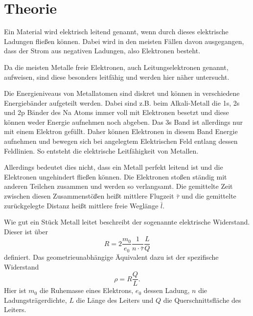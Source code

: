 \section{Theorie}
\label{sec:Theorie}






Ein Material wird elektrisch leitend genannt, wenn durch dieses elektrische Ladungen fließen können.
Dabei wird in den meisten Fällen davon ausgegangen, dass der Strom aus negativen Ladungen, also Elektronen besteht.

Da die meisten Metalle freie Elektronen, auch Leitungselektronen genannt, aufweisen, sind diese besonders leitfähig und werden hier näher untersucht.

Die Energieniveaus von Metallatomen sind diskret und können in verschiedene Energiebänder aufgeteilt werden. 
Dabei sind z.B. beim Alkali-Metall die 1s, 2s und 2p Bänder des Na Atoms immer voll mit Elektronen besetzt und diese können weder Energie aufnehmen noch abgeben.
Das 3s Band ist allerdings nur mit einem Elektron gefüllt. 
Daher können Elektronen in diesem Band Energie aufnehmen und bewegen sich bei angelegtem Elektrischen Feld entlang dessen Feldlinien.
So entsteht die elektrische Leitfähigkeit von Metallen. \cite{V311}

Allerdings bedeutet dies nicht, dass ein Metall perfekt leitend ist und die Elektronen ungehindert fließen können.
Die Elektronen stoßen ständig mit anderen Teilchen zusammen und werden so verlangsamt.
Die gemittelte Zeit zwischen diesen Zusammenstößen heißt mittlere Flugzeit $\bar{\tau}$ und die gemittelte zurückgelegte Distanz heißt mittlere freie Weglänge $\bar{l}$.

Wie gut ein Stück Metall leitet beschreibt der sogenannte elektrische Widerstand.
Dieser ist über 
\begin{equation}
    R = 2\frac{m_0}{e_0}\frac{1}{n \cdot \bar{\tau}}\frac{L}{Q}
    \label{eq:widerstand}
\end{equation}
definiert.
Das geometrieunabhängige Äquivalent dazu ist der spezifische Widerstand
\begin{equation}
    \rho = R\frac{Q}{L}.
    \label{eq:spezwiderstand}
\end{equation}
Hier ist $m_0$ die Ruhemasse eines Elektrons, $e_0$ dessen Ladung, $n$ die Ladungsträgerdichte, $L$ die Länge des Leiters und $Q$ die Querschnittsfläche des Leiters. \cite{V311}

